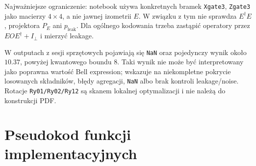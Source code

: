 \documentclass[12pt]{article}
\begin{document}
Najwa\.zniejsze ograniczenie: notebook u\.zywa konkretnych bramek \texttt{Xgate3},
\texttt{Zgate3} jako macierzy $4\times4$, a nie jawnej izometrii $E$. W zwi\k{a}zku z tym
nie sprawdza $E^\dagger E$, projektora $P_E$ ani $p_{\mathrm{leak}}$. Dla og\'olnego
kodowania trzeba zast\k{a}pi\'c operatory przez $EOE^\dagger+I_\perp$ i mierzy\'c leakage.

W outputach z sesji sprz\k{e}towych pojawiaj\k{a} si\k{e} \texttt{NaN} oraz pojedynczy wynik
oko\l{}o $10.37$, powy\.zej kwantowego boundu $8$. Taki wynik nie mo\.ze by\'c interpretowany
jako poprawna warto\'s\'c Bell expression; wskazuje na niekompletne pokrycie losowanych
sk\l{}adnik\'ow, b\l{}\k{e}dy agregacji, \texttt{NaN} albo brak kontroli leakage/noise. Rotacje
\texttt{Ry01/Ry02/Ry12} s\k{a} skanem lokalnej optymalizacji i nie nale\.z\k{a} do konstrukcji PDF.

\section{Pseudokod funkcji implementacyjnych}
\end{document}

